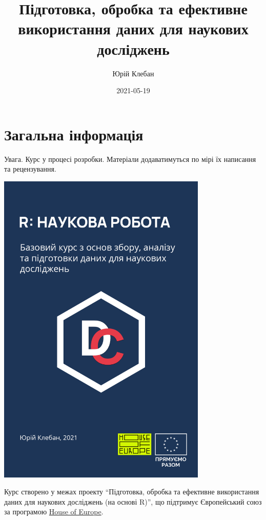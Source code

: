 \documentclass[
]{book}
\title{Підготовка, обробка та ефективне використання даних для наукових досліджень}
\author{Юрій Клебан}
\date{2021-05-19}
\begin{document}
\maketitle

{
\setcounter{tocdepth}{1}
\tableofcontents
}
\hypertarget{ux437ux430ux433ux430ux43bux44cux43dux430-ux456ux43dux444ux43eux440ux43cux430ux446ux456ux44f}{%
\chapter*{Загальна інформація}\label{ux437ux430ux433ux430ux43bux44cux43dux430-ux456ux43dux444ux43eux440ux43cux430ux446ux456ux44f}}

Увага. Курс у процесі розробки. Матеріали додаватимуться по мірі їх написання та рецензування.

\includegraphics[width=0.75\textwidth,height=\textheight]{images/cover.png}

Курс створено у межах проекту ``Підготовка, обробка та ефективне використання даних для наукових досліджень (на основі R)'', що підтримує Європейський союз за програмою \href{https://houseofeurope.org.ua/}{House of Europe}.
\end{document}
